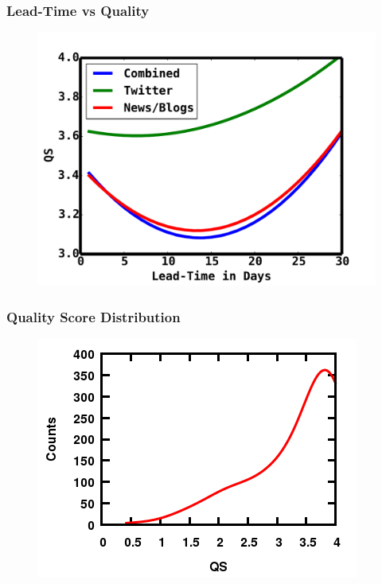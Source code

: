 \documentclass{beamer}
\begin{document}
\begin{frame}
    \frametitle{Lead-Time vs Quality}
    \begin{figure}
        \includegraphics[scale=0.4]{leadTimeVsQS}
    \end{figure}
\end{frame}

\begin{frame}
    \frametitle{Quality Score Distribution}
    \centering
    \begin{figure}
        \includegraphics[scale=0.6]{doubleHump}
    \end{figure}
\end{frame}
\end{document}
